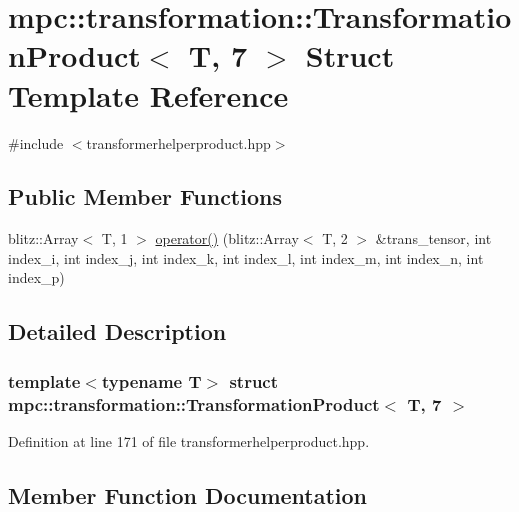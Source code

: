\hypertarget{structmpc_1_1transformation_1_1_transformation_product_3_01_t_00_017_01_4}{}\section{mpc\+:\+:transformation\+:\+:Transformation\+Product$<$ T, 7 $>$ Struct Template Reference}
\label{structmpc_1_1transformation_1_1_transformation_product_3_01_t_00_017_01_4}


{\ttfamily \#include $<$transformerhelperproduct.\+hpp$>$}

\subsection*{Public Member Functions}
\begin{DoxyCompactItemize}
\item 
blitz\+::\+Array$<$ T, 1 $>$ \mbox{\hyperlink{structmpc_1_1transformation_1_1_transformation_product_3_01_t_00_017_01_4_a2c703bb94416241b6c7b449c5b7f0899}{operator()}} (blitz\+::\+Array$<$ T, 2 $>$ \&trans\+\_\+tensor, int index\+\_\+i, int index\+\_\+j, int index\+\_\+k, int index\+\_\+l, int index\+\_\+m, int index\+\_\+n, int index\+\_\+p)
\end{DoxyCompactItemize}


\subsection{Detailed Description}
\subsubsection*{template$<$typename T$>$\newline
struct mpc\+::transformation\+::\+Transformation\+Product$<$ T, 7 $>$}



Definition at line 171 of file transformerhelperproduct.\+hpp.



\subsection{Member Function Documentation}
\mbox{\label{structmpc_1_1transformation_1_1_transformation_product_3_01_t_00_017_01_4_a2c703bb94416241b6c7b449c5b7f0899}} 
